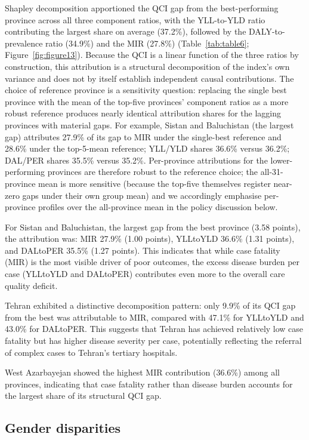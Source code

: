 \documentclass[12pt]{article}
\begin{document}
Shapley decomposition apportioned the QCI gap from the best-performing province across all three component ratios, with the YLL-to-YLD ratio contributing the largest share on average (37.2\%), followed by the DALY-to-prevalence ratio (34.9\%) and the MIR (27.8\%) (Table~\ref{tab:table6}; Figure~\ref{fig:figure13}). Because the QCI is a linear function of the three ratios by construction, this attribution is a structural decomposition of the index's own variance and does not by itself establish independent causal contributions. The choice of reference province is a sensitivity question: replacing the single best province with the mean of the top-five provinces' component ratios as a more robust reference produces nearly identical attribution shares for the lagging provinces with material gaps. For example, Sistan and Baluchistan (the largest gap) attributes 27.9\% of its gap to MIR under the single-best reference and 28.6\% under the top-5-mean reference; YLL/YLD shares 36.6\% versus 36.2\%; DAL/PER shares 35.5\% versus 35.2\%. Per-province attributions for the lower-performing provinces are therefore robust to the reference choice; the all-31-province mean is more sensitive (because the top-five themselves register near-zero gaps under their own group mean) and we accordingly emphasise per-province profiles over the all-province mean in the policy discussion below.

For Sistan and Baluchistan, the largest gap from the best province (3.58 points), the attribution was: MIR 27.9\% (1.00 points), YLLtoYLD 36.6\% (1.31 points), and DALtoPER 35.5\% (1.27 points). This indicates that while case fatality (MIR) is the most visible driver of poor outcomes, the excess disease burden per case (YLLtoYLD and DALtoPER) contributes even more to the overall care quality deficit.

Tehran exhibited a distinctive decomposition pattern: only 9.9\% of its QCI gap from the best was attributable to MIR, compared with 47.1\% for YLLtoYLD and 43.0\% for DALtoPER. This suggests that Tehran has achieved relatively low case fatality but has higher disease severity per case, potentially reflecting the referral of complex cases to Tehran's tertiary hospitals.

West Azarbayejan showed the highest MIR contribution (36.6\%) among all provinces, indicating that case fatality rather than disease burden accounts for the largest share of its structural QCI gap.

\subsection{Gender disparities}
\end{document}
